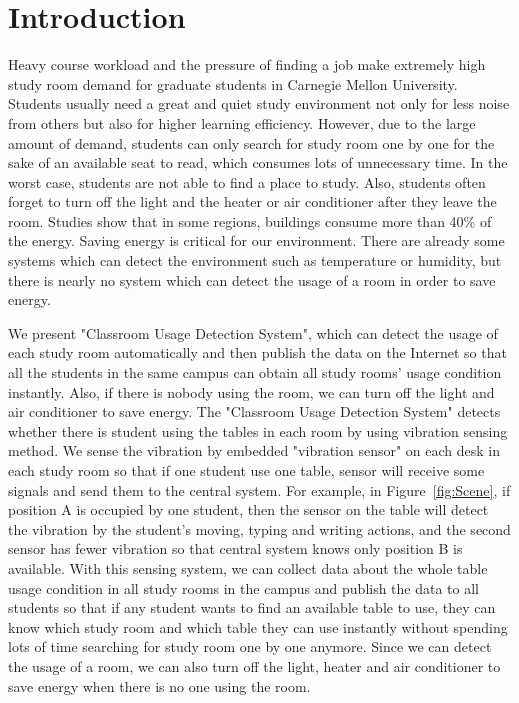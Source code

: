 \documentclass{sig-alternate-ipsn13}
\begin{document}
\section{Introduction}

Heavy course workload and the pressure of finding a job make extremely high study room demand for graduate students in Carnegie Mellon University. Students usually need a great and quiet study environment not only for less noise from others but also for higher learning efficiency. However, due to the large amount of demand, students can only search for study room one by one for the sake of an available seat to read, which consumes lots of unnecessary time. In the worst case, students are not able to find a place to study. Also, students often forget to turn off the light and the heater or air conditioner after they leave the room. Studies\cite{cite2} show that in some regions, buildings consume more than 40\% of the energy. Saving energy is critical for our environment. There are already some systems which can detect the environment such as temperature or humidity, but there is nearly no system which can detect the usage of a room in order to save energy\cite{cite3}.

We present "Classroom Usage Detection System", which can detect the usage of each study room automatically and then publish the data on the Internet so that all the students in the same campus can obtain all study rooms' usage condition instantly. Also, if there is nobody using the room, we can turn off the light and air conditioner to save energy. The "Classroom Usage Detection System" detects whether there is student using the tables in each room by using vibration sensing method. We sense the vibration by embedded "vibration sensor" on each desk in each study room so that if one student use one table, sensor will receive some signals and send them to the central system. For example, in Figure~\ref{fig:Scene}, if position A is occupied by one student, then the sensor on the table will detect the vibration by the student's moving, typing and writing actions, and the second sensor has fewer vibration so that central system knows only position B is available. With this sensing system, we can collect data about the whole table usage condition in all study rooms in the campus and publish the data to all students so that if any student wants to find an available table to use, they can know which study room and which table they can use instantly without spending lots of time searching for study room one by one anymore. Since we can detect the usage of a room, we can also turn off the light, heater and air conditioner to save energy when there is no one using the room.
\end{document}
